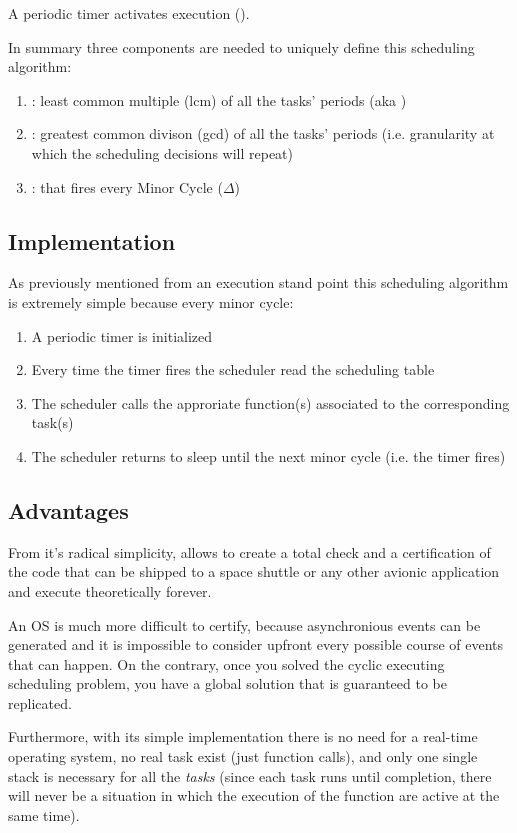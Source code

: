 A periodic timer activates execution ().

In summary three components are needed to uniquely define this scheduling algorithm:
\begin{enumerate}
\item {}: least common multiple (lcm) of all the tasks' periods (aka )
\item {}: greatest common divison (gcd) of all the tasks' periods (i.e. granularity at which the scheduling decisions will repeat)
\item {}: that fires every Minor Cycle ($\Delta$)
\end{enumerate}

\subsection{Implementation}
As previously mentioned from an execution stand point this scheduling algorithm is extremely simple because every minor cycle:
\begin{enumerate}
\item A periodic timer is initialized
\item Every time the timer fires the scheduler read the scheduling table
\item The scheduler calls the approriate function(s) associated to the corresponding task(s)
\item The scheduler returns to sleep until the next minor cycle (i.e. the timer fires)
\end{enumerate}

\subsection{Advantages}
From it's radical simplicity, allows to create a total check and a certification of the code that can be shipped to a space shuttle or any other avionic application and execute theoretically forever.

An OS is much more difficult to certify, because asynchronious events can be generated and it is impossible to consider upfront every possible course of events that can happen. On the contrary, once you solved the cyclic executing scheduling problem, you have a global solution that is guaranteed to be replicated.

Furthermore, with its simple implementation there is no need for a real-time operating system, no real task exist (just function calls), and only one single stack is necessary for all the \emph{tasks} (since each task runs until completion, there will never be a situation in which the execution of the function are active at the same time).

